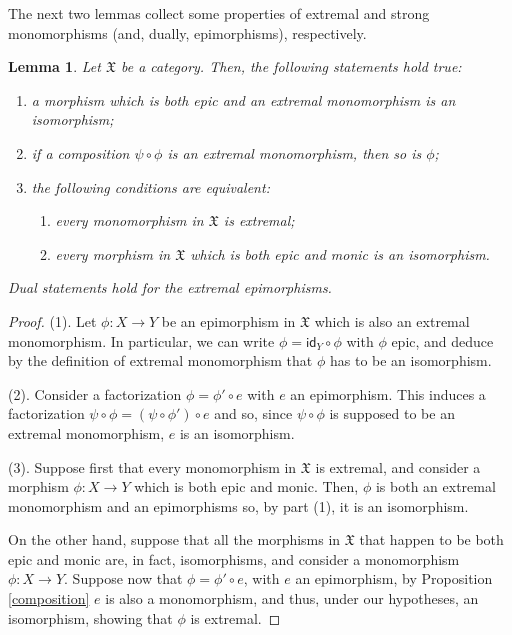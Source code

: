 \documentclass[12pt]{article}
\newtheorem{lemma}{Lemma}[section]
\theoremstyle{definition}
\def\X{\mathfrak X}
\numberwithin{equation}{section}
\newcommand{\id}[1]{\mathsf{id}_{#1}}
\begin{document}
    The next two lemmas collect some properties of extremal and strong monomorphisms (and, dually, epimorphisms), respectively.

\begin{lemma}\label{extremal_prop_lemma}
Let $\X$ be a category. Then, the following statements hold true:
\begin{enumerate}[\rm (1)]
\item a morphism which is both epic and an extremal monomorphism is an isomorphism;
\item if a composition $\psi\circ \phi$ is an extremal monomorphism, then so is $\phi$;
\item the following conditions are equivalent:
\begin{enumerate}[\rm ({3.}1)]
\item every monomorphism in $\X$ is extremal;
\item every morphism in $\X$ which is both epic and monic is an isomorphism.
\end{enumerate}
\end{enumerate}
Dual statements hold for the extremal epimorphisms. 
\end{lemma}
\begin{proof}
(1). Let $\phi\colon X\to Y$ be an epimorphism in $\X$ which is also an extremal monomorphism. In particular, we can write $\phi=\id Y\circ \phi$ with $\phi$ epic, and deduce by the definition of extremal monomorphism that $\phi$ has to be an isomorphism.

\smallskip\noindent
(2). Consider a factorization $\phi=\phi'\circ e$ with $e$ an epimorphism. This induces a factorization $\psi\circ \phi=(\psi\circ\phi')\circ e$ and so, since $\psi\circ \phi$ is supposed to be an extremal monomorphism, $e$ is an isomorphism.

\smallskip\noindent
(3). Suppose first that every monomorphism in $\X$ is extremal, and consider a morphism $\phi\colon X\to Y$ which is both epic and monic. Then, $\phi$ is both an extremal monomorphism and an epimorphisms so, by part (1), it is an isomorphism. 

On the other hand, suppose that all the morphisms in $\X$ that happen to be both epic and monic are, in fact, isomorphisms, and consider a monomorphism $\phi\colon X\to Y$. Suppose now that $\phi=\phi'\circ e$, with $e$ an epimorphism, by Proposition \ref{composition} $e$ is also a monomorphism, and thus, under our hypotheses, an isomorphism, showing that $\phi$ is extremal.
\end{proof}
\end{document}

